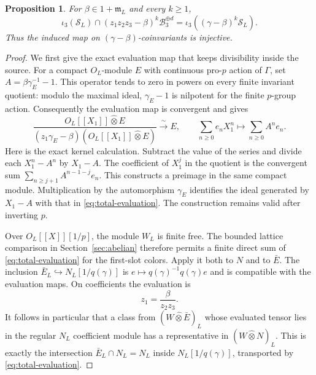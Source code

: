 \documentclass[11pt]{article}
\newtheorem{proposition}[theorem]{Proposition}
\theoremstyle{definition}\newtheorem{definition}[theorem]{Definition}
\begin{document}
\begin{proposition}\label{prop:degree-three-saturation}
For $\beta\in1+\mathfrak m_L$ and every $k\geq1$,
\[
 \iota_3(\mathcal S_L)\cap
 (z_1z_2z_3-\beta)^k\mathcal B_3^{\oplus d}
       =\iota_3((\gamma-\beta)^k\mathcal S_L).
\]
Thus the induced map on $(\gamma-\beta)$-coinvariants
is injective.
\end{proposition}
\begin{proof}
We first give the exact evaluation map that keeps
divisibility inside the source. For a compact
$O_L$-module $E$ with continuous pro-$p$ action of
$\Gamma$, set $A=\beta\gamma_E^{-1}-1$.
This operator tends to zero in powers on every finite
invariant quotient: modulo the maximal ideal,
$\gamma_E-1$ is nilpotent for the finite $p$-group action.
Consequently the evaluation map is convergent and gives
\begin{equation}\label{eq:total-evaluation}
 \frac{O_L[[X_1]]\widehat\otimes E}
 {(z_1\gamma_E-\beta)(O_L[[X_1]]\widehat\otimes E)}
 \xrightarrow{\ \sim\ }E,\qquad
        \sum_{n\geq0}e_nX_1^n\longmapsto\sum_{n\geq0}A^ne_n.
\end{equation}
Here is the exact kernel calculation. Subtract the value
of the series and divide each $X_1^n-A^n$ by $X_1-A$.
The coefficient of $X_1^j$ in the quotient is the
convergent sum $\sum_{n\geq j+1}A^{n-1-j}e_n$.
This constructs a preimage in the same compact module.
Multiplication by the automorphism $\gamma_E$ identifies
the ideal generated by $X_1-A$ with that in
\eqref{eq:total-evaluation}.
The construction remains valid after inverting $p$.

Over $O_L[[X]][1/p]$, the module $W_L$ is finite free.
The bounded lattice comparison in Section~\ref{sec:abelian}
therefore permits a finite direct sum of
\eqref{eq:total-evaluation} for the first-slot colors.
Apply it both to $N$ and to $\bar E$.
The inclusion $\bar E_L\hookrightarrow N_L[1/q(\gamma)]$
is $e\mapsto q(\gamma)^{-1}q(\gamma)e$ and is compatible
with the evaluation maps. On coefficients the evaluation is
\[
                         z_1=\frac{\beta}{z_2z_3}.
\]
It follows in particular that a class from
$(W\widehat\otimes\bar E)_L$ whose evaluated tensor
lies in the regular $N_L$ coefficient module has a
representative in $(W\widehat\otimes N)_L$.
This is exactly the intersection $\bar E_L\cap N_L=N_L$
inside $N_L[1/q(\gamma)]$, transported by
\eqref{eq:total-evaluation}.


\end{proof}
\end{document}
